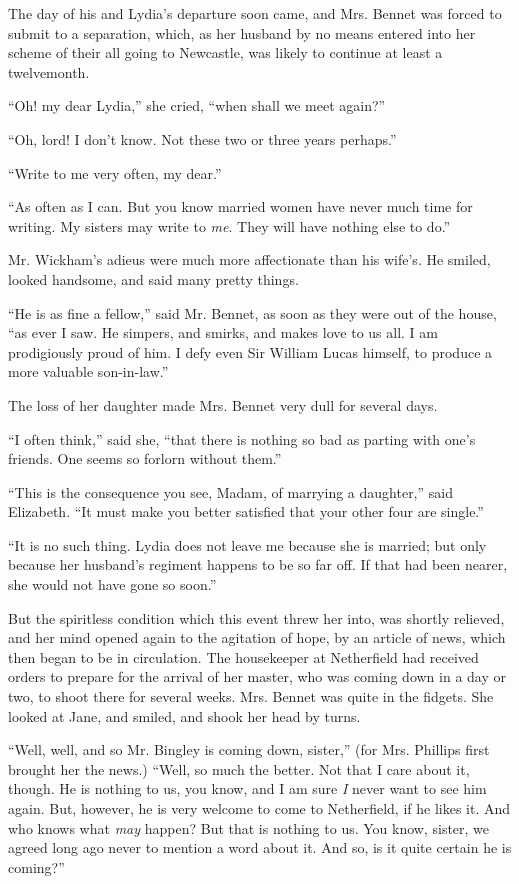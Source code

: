 The day of his and Lydia’s departure soon came, and
Mrs. Bennet was forced to submit to a separation, which,
as her husband by no means entered into her scheme of
their all going to Newcastle, was likely to continue at
least a twelvemonth.

“Oh! my dear Lydia,” she cried, “when shall we meet
again?”

“Oh, lord! I don’t know. Not these two or three
years perhaps.”

“Write to me very often, my dear.”

“As often as I can. But you know married women
have never much time for writing. My sisters may write
to \textit{me}. They will have nothing else to do.”

Mr. Wickham’s adieus were much more affectionate than
his wife’s. He smiled, looked handsome, and said many
pretty things.

“He is as fine a fellow,” said Mr. Bennet, as soon as
they were out of the house, “as ever I saw. He simpers,
and smirks, and makes love to us all. I am prodigiously
proud of him. I defy even Sir William Lucas himself,
to produce a more valuable son-in-law.”

The loss of her daughter made Mrs. Bennet very dull
for several days.

“I often think,” said she, “that there is nothing so
bad as parting with one’s friends. One seems so forlorn
without them.”

“This is the consequence you see, Madam, of marrying
a daughter,” said Elizabeth. “It must make you better
satisfied that your other four are single.”

“It is no such thing. Lydia does not leave me because
she is married; but only because her husband’s regiment
happens to be so far off. If that had been nearer, she
would not have gone so soon.”

But the spiritless condition which this event threw her
into, was shortly relieved, and her mind opened again to
the agitation of hope, by an article of news, which then
began to be in circulation. The housekeeper at Netherfield
had received orders to prepare for the arrival of her
master, who was coming down in a day or two, to shoot
there for several weeks. Mrs. Bennet was quite in the
fidgets. She looked at Jane, and smiled, and shook her
head by turns.

“Well, well, and so Mr. Bingley is coming down, sister,”
(for Mrs. Phillips first brought her the news.) “Well, so
much the better. Not that I care about it, though. He
is nothing to us, you know, and I am sure \textit{I} never want
to see him again. But, however, he is very welcome to
come to Netherfield, if he likes it. And who knows what
\textit{may} happen? But that is nothing to us. You know,
sister, we agreed long ago never to mention a word about
it. And so, is it quite certain he is coming?”

